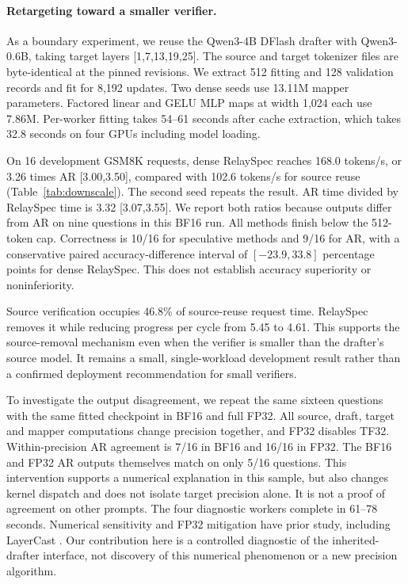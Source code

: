 \documentclass{article}
\begin{document}
\begin{table}[H]
\centering\small

\caption{Rank-1,024 throughput retained relative to the paired full map
on 32 exposed questions with a 128-token cap. Posthoc arms inherit a
trained dense map, while direct fitting starts from the original teacher
pairs. The deployment rank is matched, not total adaptation compute.}
\label{tab:compression-objective}
\end{table}

\paragraph{Retargeting toward a smaller verifier.}
\label{app:downscale}
As a boundary experiment, we reuse the Qwen3-4B DFlash drafter with
Qwen3-0.6B, taking target layers [1,7,13,19,25]. The source and target
tokenizer files are byte-identical at the pinned revisions. We extract
512 fitting and 128 validation records and fit for 8,192 updates.
Two dense seeds use 13.11M mapper parameters. Factored linear and GELU
MLP maps at width 1,024 each use 7.86M. Per-worker fitting takes
54--61 seconds after cache extraction, which takes 32.8 seconds on
four GPUs including model loading.

On 16 development GSM8K requests, dense RelaySpec reaches 168.0 tokens/s,
or 3.26 times AR [3.00,3.50], compared with 102.6 tokens/s for source
reuse (Table~\ref{tab:downscale}). The second seed repeats the result.
AR time divided by RelaySpec time is 3.32 [3.07,3.55]. We report both
ratios because outputs differ from AR on nine questions in this BF16
run. All methods finish below the 512-token cap. Correctness is 10/16
for speculative methods and 9/16 for AR, with a conservative paired
accuracy-difference interval of $[-23.9,33.8]$ percentage points for
dense RelaySpec. This does not establish accuracy superiority or
noninferiority.

Source verification occupies 46.8\% of source-reuse request time.
RelaySpec removes it while reducing progress per cycle from 5.45 to
4.61. This supports the source-removal mechanism even when the verifier
is smaller than the drafter's source model. It remains a small,
single-workload development result rather than a confirmed deployment
recommendation for small verifiers.

To investigate the output disagreement, we repeat the same sixteen
questions with the same fitted checkpoint in BF16 and full FP32.
All source, draft, target and mapper computations change precision
together, and FP32 disables TF32. Within-precision AR agreement is
7/16 in BF16 and 16/16 in FP32. The BF16 and FP32 AR outputs themselves
match on only 5/16 questions. This intervention supports a numerical
explanation in this sample, but also changes kernel dispatch and does
not isolate target precision alone. It is not a proof of agreement on
other prompts. The four diagnostic workers complete in 61--78 seconds.
Numerical sensitivity and FP32 mitigation have prior study, including
LayerCast \citep{yuan2025numerical}. Our contribution here is a controlled
diagnostic of the inherited-drafter interface, not discovery of this
numerical phenomenon or a new precision algorithm.
\end{document}

